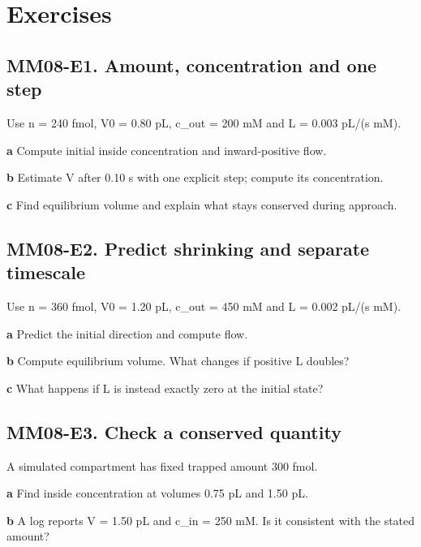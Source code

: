 \documentclass[11pt,letterpaper]{article}
\theoremstyle{definition}\newtheorem{definition}{Definition}\newtheorem{example}{Example}
\numberwithin{equation}{section}
\begin{document}
\section*{Exercises}
\par\noindent\begin{minipage}{\linewidth}
\subsection*{MM08-E1. Amount, concentration and one step}
Use n =\allowbreak{} 240 fmol, V0 =\allowbreak{} 0.80 pL, c\_out =\allowbreak{} 200 mM and L =\allowbreak{} 0.003 pL/(s mM).

\textbf{a} Compute initial inside concentration and inward-positive flow.

\end{minipage}\par\medskip
\textbf{b} Estimate V after 0.10 s with one explicit step; compute its concentration.

\textbf{c} Find equilibrium volume and explain what stays conserved during approach.

\par\noindent\begin{minipage}{\linewidth}
\subsection*{MM08-E2. Predict shrinking and separate timescale}
Use n =\allowbreak{} 360 fmol, V0 =\allowbreak{} 1.20 pL, c\_out =\allowbreak{} 450 mM and L =\allowbreak{} 0.002 pL/(s mM).

\textbf{a} Predict the initial direction and compute flow.

\end{minipage}\par\medskip
\textbf{b} Compute equilibrium volume. What changes if positive L doubles?

\textbf{c} What happens if L is instead exactly zero at the initial state?

\par\noindent\begin{minipage}{\linewidth}
\subsection*{MM08-E3. Check a conserved quantity}
A simulated compartment has fixed trapped amount 300 fmol.

\textbf{a} Find inside concentration at volumes 0.75 pL and 1.50 pL.

\end{minipage}\par\medskip
\textbf{b} A log reports V =\allowbreak{} 1.50 pL and c\_in =\allowbreak{} 250 mM. Is it consistent with the stated amount?
\end{document}
